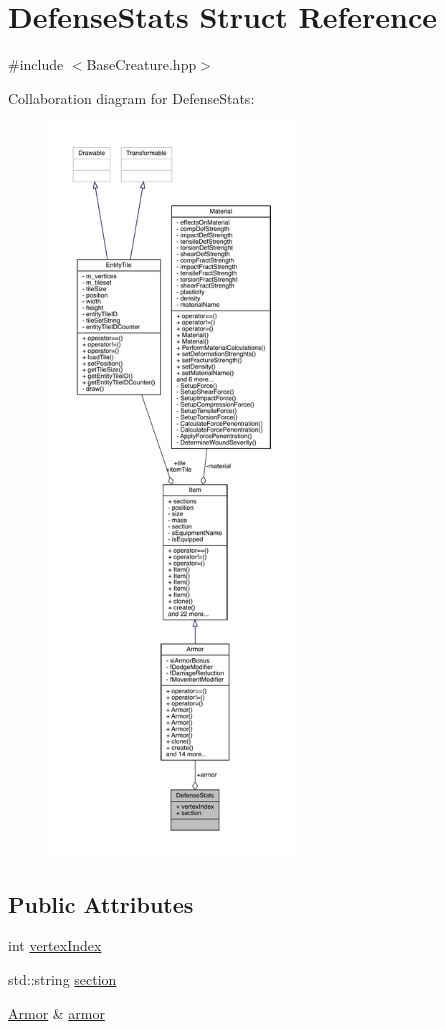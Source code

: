 \hypertarget{struct_defense_stats}{}\section{Defense\+Stats Struct Reference}
\label{struct_defense_stats}


{\ttfamily \#include $<$Base\+Creature.\+hpp$>$}



Collaboration diagram for Defense\+Stats\+:
\nopagebreak
\begin{figure}[H]
\begin{center}
\leavevmode
\includegraphics[height=550pt]{dd/d47/struct_defense_stats__coll__graph}
\end{center}
\end{figure}
\subsection*{Public Attributes}
\begin{DoxyCompactItemize}
\item 
int \mbox{\hyperlink{struct_defense_stats_a495e186aa26d97e4bf2b80ad44e7a260}{vertex\+Index}}
\item 
std\+::string \mbox{\hyperlink{struct_defense_stats_a32afd7fa0576be676dca6fcf8cc33cf5}{section}}
\item 
\mbox{\hyperlink{class_armor}{Armor}} \& \mbox{\hyperlink{struct_defense_stats_ae352b45ea400b564a0ee8e860b0d8525}{armor}}
\end{DoxyCompactItemize}


